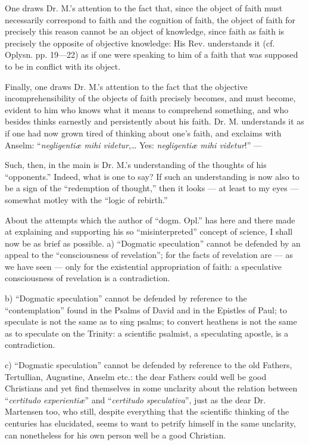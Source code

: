 \documentclass[12pt,a4paper,openany]{book}
\newcommand{\opage}[1]{\marginnote{\footnotesize\textit{[#1]}}}
\begin{document}
One draws Dr. M.'s attention to the fact that, since the object of
faith must necessarily correspond to faith and the cognition of faith,
the object of faith for precisely this reason
cannot be an object of knowledge, since faith as faith is precisely
the opposite of objective knowledge: His Rev. understands it
\setcounter{footnote}{0}%
\opage{65}(cf. Oplysn. pp. 19—22) as if one were speaking to him of
a faith that was supposed to be in conflict with its object.

Finally, one draws Dr. M.'s attention to the fact that the objective
incomprehensibility of the objects of faith precisely becomes, and must
become, evident to him who knows what it means to comprehend
something, and who besides thinks earnestly and persistently about
his faith. Dr. M. understands it as if one had now grown
tired of thinking about one's faith, and exclaims with Anselm:
``\textit{negligentiæ mihi videtur},\dots{} Yes: \textit{negligentiæ mihi videtur}!''
---

Such, then, in the main is Dr. M.'s understanding of the thoughts
of his ``opponents.'' Indeed, what is one to say? If
such an understanding is now also to be a sign of the ``redemption
of thought,'' then it looks --- at least to my eyes ---
somewhat motley with the ``logic of rebirth.''

About the attempts which the author of ``dogm. Opl.'' has here and there
made at explaining and supporting his so ``misinterpreted''
concept of science, I shall now be as brief as possible.
a) ``Dogmatic speculation'' cannot be defended
by an appeal to the ``consciousness of revelation''; for
the facts of revelation are --- as we have seen
--- only for the existential appropriation of faith: a speculative
consciousness of revelation is a contradiction.

b) ``Dogmatic speculation'' cannot be defended
by reference to the ``contemplation'' found in the Psalms
of David and in the Epistles of Paul; to speculate is not the
same as to sing psalms; to convert heathens is
not the same as to speculate on the Trinity: a
scientific psalmist, a speculating apostle, is a
contradiction.

\setcounter{footnote}{0}%
\opage{66}c) ``Dogmatic speculation'' cannot be defended
by reference to the old Fathers, Tertullian, Augustine,
Anselm etc.: the dear Fathers could well be good
Christians and yet find themselves in some unclarity about the relation
between ``\textit{certitudo experientiæ}'' and ``\textit{certitudo}
\textit{speculativa}'', just as the dear Dr. Martensen too,
who still, despite everything that the scientific thinking
of the centuries has elucidated, seems to want to petrify himself in the same
unclarity, can nonetheless for his own person well be a
good Christian.
\end{document}

